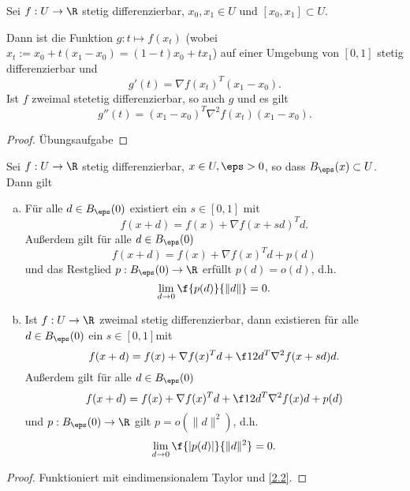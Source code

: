 \documentclass{mycourse}
\begin{document}
\begin{st} \label{2.2}
	Sei $f: U \to \R$ stetig differenzierbar, $x_0, x_1 \in U$ und $[x_0, x_1] \subset U$.

	Dann ist die Funktion $g: t \mapsto f(x_t)$ (wobei $x_t := x_0 + t(x_1 - x_0) = (1-t) x_0 + tx_1$) auf einer Umgebung von $[0,1]$ stetig differenzierbar und
	\[
		g'(t) = \nabla f(x_t)^T (x_1 - x_0).
	\]
	Ist $f$ zweimal stetetig differenzierbar, so auch $g$ und es gilt
	\[
		g''(t) = (x_1 - x_0)^T \nabla^2 f(x_t) (x_1 - x_0).
	\]
	\begin{proof}
		Übungsaufgabe
	\end{proof}
\end{st}

\begin{st} \label{2.3}
	Sei $f : U \to \R$ stetig differenzierbar, $x\in U, \eps > 0$, so dass $B_\eps(x) \subset U$.
	Dann gilt
	\begin{enumerate}[(a)]
		\item
			Für alle $d \in B_\eps(0)$ existiert ein $s \in [0,1]$ mit
			\[
				f(x+d) = f(x) + \nabla f(x + sd)^T d.
			\]
			Außerdem gilt für alle $d \in B_\eps(0)$
			\[
				f(x+d) = f(x) + \nabla f(x)^T d + p(d)
			\]
			und das Restglied $p: B_\eps(0) \to \R$ erfüllt $p(d) = o(d)$, d.h.
			\[
				\lim_{d\to 0} \f {p(d)}{\|d\|} = 0.
			\]
		\item
			Ist $f: U \to \R$ zweimal stetig differenzierbar, dann existieren für alle $d \in B_\eps(0)$ ein $s \in [0,1]$mit
			\[
				f(x+d)
				= f(x) + \nabla f(x)^T d + \f 12 d^T \nabla^2 f(x+sd) d.
			\]
			Außerdem gilt für alle $d \in B_\eps(0)$
			\[
				f(x+d) = f(x) + \nabla f(x)^T d + \f 12 d^T \nabla^2 f(x) d + p(d)
			\]
			und $p: B_\eps(0) \to \R$ gilt $p = o(\|d\|^2)$, d.h.
			\[
				\lim_{d\to 0} \f{|p(d)|}{\|d\|^2} = 0.
			\]
	\end{enumerate}
	\begin{proof}
		Funktioniert mit eindimensionalem Taylor und \ref{2.2}.
	\end{proof}
\end{st}
\end{document}
